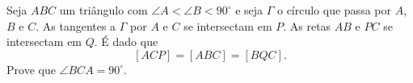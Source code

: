 Seja $ABC$ um triângulo com $\angle A < \angle B < 90^\circ$ e seja $\Gamma$ o círculo que passa por $A$, $B$ e $C$.
As tangentes a $\Gamma$ por $A$ e $C$ se intersectam em $P$.
As retas $AB$ e $PC$ se intersectam em $Q$. É dado que \[[ACP] = [ABC] = [BQC].\] Prove que $\angle BCA = 90^\circ$.
